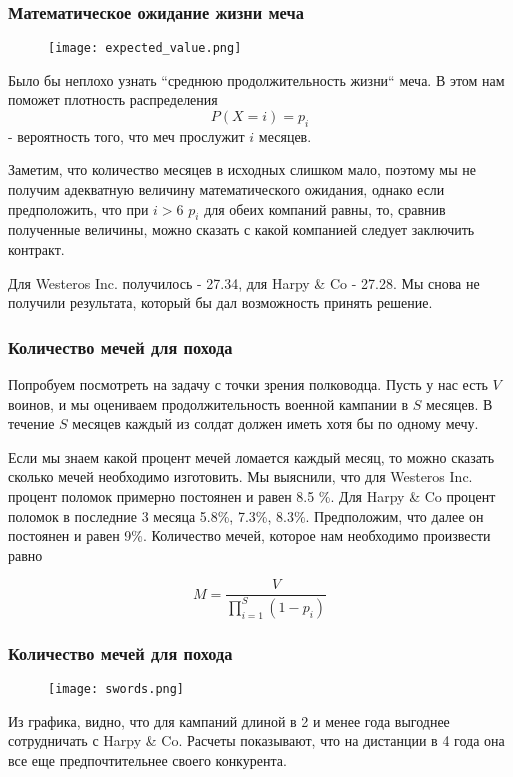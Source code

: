 \documentclass[8pt]{beamer}
\begin{document}
\begin{frame}
\frametitle{Математическое ожидание жизни меча}
\begin{figure}[h]
		\texttt{[image: expected\_value.png]}
\end{figure}

Было бы неплохо узнать ``среднюю продолжительность жизни``  меча. В этом нам поможет плотность распределения
	$$ P(X = i) = p_{i} $$ - вероятность того, что меч прослужит $ i $ месяцев.
	\par
	Заметим, что количество месяцев в исходных слишком мало, поэтому мы не получим адекватную величину математического ожидания, однако если предположить, что при $ i > 6 $  $ p_{i} $ для обеих компаний равны, то, сравнив полученные величины, можно сказать с какой компанией следует заключить контракт.
	\par
	Для Westeros Inc. получилось - 27.34, для Harpy \& Co - 27.28. Мы снова не получили результата, который бы дал возможность принять решение.
\end{frame}

\begin{frame}
\frametitle{Количество мечей для похода}

	Попробуем посмотреть на задачу с точки зрения полководца. Пусть у нас есть $ V $ воинов, и мы оцениваем продолжительность военной кампании в $ S $ месяцев. В течение $ S $ месяцев каждый из солдат должен иметь хотя бы по одному мечу. 
	\par
	Если мы знаем какой процент мечей ломается каждый месяц, то можно сказать сколько мечей необходимо изготовить. 
	Мы выяснили, что для Westeros Inc. процент поломок примерно постоянен и равен 8.5 \%. Для Harpy \& Co процент поломок в последние 3 месяца 5.8\%, 7.3\%, 8.3\%. Предположим, что далее он постоянен и равен 9\%.
	Количество мечей, которое нам необходимо произвести равно
		
		$$ M = \frac{V}{\prod_{i=1}^S(1 - p_{i})} $$
\end{frame}


\begin{frame}
\frametitle{Количество мечей для похода}
\begin{figure}[h]
	\texttt{[image: swords.png]}
\end{figure}
	Из графика, видно, что для кампаний длиной в 2 и менее года выгоднее сотрудничать с Harpy \& Co. Расчеты показывают, что на дистанции в 4 года она все еще предпочтительнее своего конкурента.
\end{frame}
\end{document}
